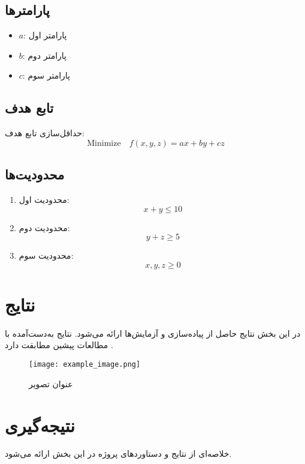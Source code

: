 \subsection*{پارامترها}
\begin{itemize}
    \item $ a $: پارامتر اول
    \item $ b $: پارامتر دوم
    \item $ c $: پارامتر سوم
\end{itemize}

\subsection*{تابع هدف}
حداقل‌سازی تابع هدف:
\[
\text{Minimize} \quad f(x,y,z) = ax + by + cz
\]

\subsection*{محدودیت‌ها}
\begin{enumerate}
    \item محدودیت اول:
    \[
    x + y \leq 10
    \]
    \item محدودیت دوم:
    \[
    y + z \geq 5
    \]
    \item محدودیت سوم:
    \[
    x, y, z \geq 0
    \]
\end{enumerate}

\section{نتایج}
در این بخش نتایج حاصل از پیاده‌سازی و آزمایش‌ها ارائه می‌شود. نتایج به‌دست‌آمده با مطالعات پیشین مطابقت دارد \cite{ref-1}.

\begin{figure}[h]
    \centering
    \texttt{[image: example\_image.png]}
    \caption{عنوان تصویر}
    \label{fig:example}
\end{figure}

\section{نتیجه‌گیری}
خلاصه‌ای از نتایج و دستاورد‌های پروژه در این بخش ارائه می‌شود.
